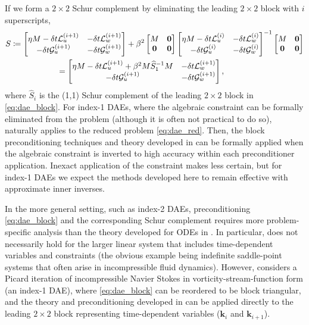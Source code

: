 \documentclass[review]{siamart}
\begin{document}
%
If we form a $2\times 2$ Schur complement by eliminating the leading
$2\times 2$ block with $i$ superscripts,
%
\begin{align}\nonumber
S \coloneqq \begin{bmatrix} \eta M - \delta t\mathcal{L}_{u}^{(i+1)} &
	-\delta t\mathcal{L}_{w}^{(i+1)} \\ -\delta t\mathcal{G}_{u}^{(i+1)} &
		-\delta t\mathcal{G}_w^{(i+1)} \end{bmatrix}&
	+ \beta^2 \begin{bmatrix} M & \mathbf{0} \\\mathbf{0} & \mathbf{0} \end{bmatrix}
	\begin{bmatrix} \eta M - \delta t\mathcal{L}_{u}^{(i)} &
	-\delta t\mathcal{L}_{w}^{(i)} \\ -\delta t\mathcal{G}_{u}^{(i)} &
		-\delta t\mathcal{G}_w^{(i)} \end{bmatrix}^{-1}
	\begin{bmatrix} M & \mathbf{0} \\\mathbf{0} & \mathbf{0} \end{bmatrix} \\
&\hspace{-20ex}
= \begin{bmatrix} \eta M - \delta t\mathcal{L}_{u}^{(i+1)} + \beta^2M \widehat{S}_1^{-1}M &
	-\delta t\mathcal{L}_{w}^{(i+1)} \\ -\delta t\mathcal{G}_{u}^{(i+1)} &
		-\delta t\mathcal{G}_w^{(i+1)} \end{bmatrix},\label{eq:dae_red}
\end{align}
%
where $\widehat{S}_i$ is the (1,1) Schur complement of the leading $2\times2$
block in \eqref{eq:dae_block}.
For index-1 DAEs, where the algebraic constraint can be formally eliminated from
the problem (although it is often not practical to do so), 
naturally applies to the reduced problem \eqref{eq:dae_red}. Then, the block preconditioning
techniques and theory developed in  can be formally applied
when the algebraic constraint is inverted to high accuracy within each
preconditioner application. Inexact application of the constraint makes
 less certain, but for index-1 DAEs we expect the methods
developed here to remain effective with approximate inner inverses.

In the more general setting, such as index-2 DAEs, preconditioning
\eqref{eq:dae_block} and the corresponding Schur complement requires more
problem-specific analysis than the theory developed for ODEs in
. In particular,  does not necessarily hold for
the larger linear system that includes time-dependent variables and constraints
(the obvious example being indefinite saddle-point systems that often arise in
incompressible fluid dynamics). However,  considers a
Picard iteration of incompressible Navier Stokes in vorticity-stream-function
form (an index-1 DAE), where \eqref{eq:dae_block} can be reordered to be block
triangular, and the theory and preconditioning developed in 
can be applied directly to the leading $2\times 2$ block representing
time-dependent variables ($\mathbf{k}_i$ and $\mathbf{k}_{i+1}$).
\end{document}
